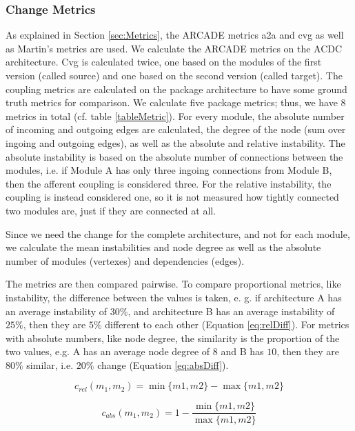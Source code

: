 \documentclass[sigplan, anonymous, review]{acmart}
\begin{document}
\subsubsection{Change Metrics}

As explained in Section \ref{sec:Metrics}, the ARCADE metrics a2a and cvg as well as Martin's metrics are used. We calculate the ARCADE metrics on the ACDC architecture. Cvg is calculated twice, one based on the modules of the first version (called source) and one based on the second version (called target).
The coupling metrics are calculated on the package architecture to have some ground truth metrics for comparison. We calculate five package metrics; thus, we have 8 metrics in total (cf. table \ref{tableMetric}).
For every module, the absolute number of incoming and outgoing edges are calculated, the degree of the node (sum over ingoing and outgoing edges), as well as the absolute and relative instability. The absolute instability is based on the absolute number of connections between the modules, i.e. if Module A has only three ingoing connections from Module B, then the afferent coupling is considered three. For the relative instability, the coupling is instead considered one, so it is not measured how tightly connected two modules are, just if they are connected at all.

Since we need the change for the complete architecture, and not for each module, we calculate the mean instabilities and node degree as well as the absolute number of modules (vertexes) and dependencies (edges).

The metrics are then compared pairwise. To compare proportional metrics, like instability, the difference between the values is taken, e. g. if architecture A has an average instability of $30\%$, and architecture B has an average instability of $25\%$, then they are $5\%$ different to each other (Equation \ref{eq:relDiff}). For metrics with absolute numbers, like node degree, the similarity is the proportion of the two values, e.g. A has an average node degree of $8$ and B has $10$, then they are $80\%$ similar, i.e. $20\%$ change (Equation \ref{eq:absDiff}).

\begin{equation} \label{eq:relDiff}
c_{rel}(m_1, m_2) =  \min\{m1, m2\} - \max\{m1, m2\}
\end{equation} 

\begin{equation} \label{eq:absDiff}
	c_{abs}(m_1, m_2) = 1 - \frac{\min\{m1, m2\}}{\max\{m1, m2\}}
\end{equation} 
\end{document}
